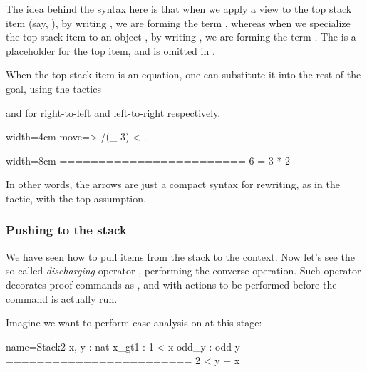 The idea behind the syntax here is that when we apply a view  to
the top stack item (say, ), by writing , we are
forming the term , whereas
when we specialize the top stack item  to an object ,
by writing , we are forming the term .  The \C{_}
is a placeholder for the top item, and is
omitted in .

When the top stack item is an equation, one can substitute it into
the rest of the goal, using the tactics \C{<-}

and \C{->} for right-to-left and left-to-right respectively.

\begin{coq-left}{}{width=4cm}
move=> /(_ 3) <-.
$~$
\end{coq-left}
\begin{coqout-right}{}{width=8cm}
========================
6 = 3 * 2
\end{coqout-right}

In other words, the arrows are just a compact syntax for rewriting,
as in the  tactic, with the top assumption.

\subsubsection{Pushing to the stack}

We have seen how to pull items from the stack to the context.
Now let's see the so called \emph{discharging} operator \C{:}, performing
the converse operation.
Such operator decorates
proof commands as ,  and 
 with actions to be performed before the command is actually run.


Imagine we want to perform case analysis on  at this stage:

\begin{coqout}{name=Stack2}{}
 x, y : nat
 x_gt1 : 1 < x
 odd_y : odd y
 ========================
 2 < y + x
\end{coqout}

